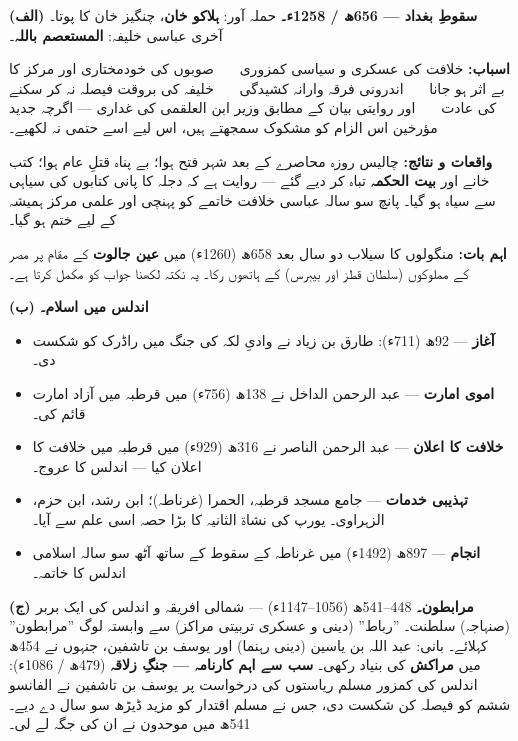 \begin{hal}
\textbf{(الف) سقوطِ بغداد --- \textenglish{656}ھ / \textenglish{1258}ء۔}
حملہ آور: \textbf{ہلاکو خان}، چنگیز خان کا پوتا۔ آخری عباسی خلیفہ:
\textbf{المستعصم باللہ}۔

\smallskip
\textbf{اسباب:} خلافت کی عسکری و سیاسی کمزوری \ \textbullet\ \ صوبوں کی
خودمختاری اور مرکز کا بے اثر ہو جانا \ \textbullet\ \ اندرونی فرقہ وارانہ
کشیدگی \ \textbullet\ \ خلیفہ کی بروقت فیصلہ نہ کر سکنے کی عادت \ \textbullet\ \
اور روایتی بیان کے مطابق وزیر ابن العلقمی کی غداری --- اگرچہ جدید مؤرخین اس
الزام کو مشکوک سمجھتے ہیں، اس لیے اسے حتمی نہ لکھیے۔

\smallskip
\textbf{واقعات و نتائج:} چالیس روزہ محاصرے کے بعد شہر فتح ہوا؛ بے پناہ قتلِ عام
ہوا؛ کتب خانے اور \textbf{بیت الحکمہ} تباہ کر دیے گئے --- روایت ہے کہ دجلہ کا
پانی کتابوں کی سیاہی سے سیاہ ہو گیا۔ پانچ سو سالہ عباسی خلافت خاتمے کو پہنچی
اور علمی مرکز ہمیشہ کے لیے ختم ہو گیا۔

\smallskip
\textbf{اہم بات:} منگولوں کا سیلاب دو سال بعد \textenglish{658}ھ
(\textenglish{1260}ء) میں \textbf{عین جالوت} کے مقام پر مصر کے مملوکوں (سلطان
قطز اور بیبرس) کے ہاتھوں رکا۔ یہ نکتہ لکھنا جواب کو مکمل کرتا ہے۔

\medskip
\textbf{(ب) اندلس میں اسلام۔}
\begin{itemize}\setlength{\itemsep}{1pt}
  \item \textbf{آغاز} --- \textenglish{92}ھ (\textenglish{711}ء): طارق بن زیاد
        نے وادیِ لکہ کی جنگ میں راڈرک کو شکست دی۔
  \item \textbf{اموی امارت} --- عبد الرحمن الداخل نے \textenglish{138}ھ
        (\textenglish{756}ء) میں قرطبہ میں آزاد امارت قائم کی۔
  \item \textbf{خلافت کا اعلان} --- عبد الرحمن الناصر نے \textenglish{316}ھ
        (\textenglish{929}ء) میں قرطبہ میں خلافت کا اعلان کیا --- اندلس کا
        عروج۔
  \item \textbf{تہذیبی خدمات} --- جامع مسجد قرطبہ، الحمرا (غرناطہ)؛ ابن رشد،
        ابن حزم، الزہراوی۔ یورپ کی نشاۃ الثانیہ کا بڑا حصہ اسی علم سے آیا۔
  \item \textbf{انجام} --- \textenglish{897}ھ (\textenglish{1492}ء) میں غرناطہ
        کے سقوط کے ساتھ آٹھ سو سالہ اسلامی اندلس کا خاتمہ۔
\end{itemize}

\medskip
\textbf{(ج) مرابطون۔} \textenglish{448--541}ھ (\textenglish{1056--1147}ء) ---
شمالی افریقہ و اندلس کی ایک بربر (صنہاجہ) سلطنت۔ ''رباط'' (دینی و عسکری
تربیتی مراکز) سے وابستہ لوگ ''مرابطون'' کہلائے۔ بانی: عبد اللہ بن یاسین
(دینی رہنما) اور یوسف بن تاشفین، جنہوں نے \textenglish{454}ھ میں
\textbf{مراکش} کی بنیاد رکھی۔ \textbf{سب سے اہم کارنامہ --- جنگِ زلاقہ}
(\textenglish{479}ھ / \textenglish{1086}ء): اندلس کی کمزور مسلم ریاستوں کی
درخواست پر یوسف بن تاشفین نے الفانسو ششم کو فیصلہ کن شکست دی، جس نے مسلم
اقتدار کو مزید ڈیڑھ سو سال دے دیے۔ \textenglish{541}ھ میں موحدون نے ان کی جگہ
لے لی۔
\end{hal}
